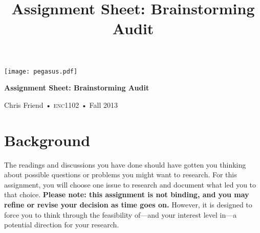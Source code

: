 \documentclass[12pt]{amsart}	%
\title[Brainstorming Audit]{Assignment Sheet: Brainstorming Audit}
\begin{document}
%
\thispagestyle{empty}

\vspace{-2in}
\begin{center}
\huge
{\texttt{[image: pegasus.pdf]}}

\textbf{Assignment Sheet: Brainstorming Audit}

{\normalsize Chris Friend • \textsc{enc1102} • Fall 2013}
\end{center}
\vspace{1.5\baselineskip}

\section{Background} %
\label{sec:background}
The readings and discussions you have done should have gotten you thinking about possible questions or problems you might want to research. For this assignment, you will choose one issue to research and document what led you to that choice. \textbf{Please note: this assignment is not binding, and you may refine or revise your decision as time goes on.} However, it is designed to force you to think through the feasibility of—and your interest level in—a potential direction for your research.
\end{document}
